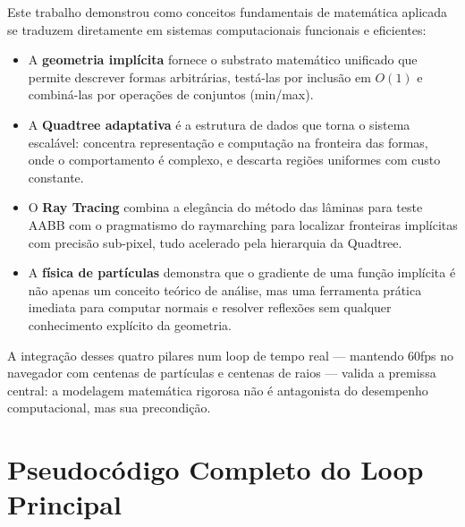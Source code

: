 \documentclass[11pt,a4paper]{article}
\theoremstyle{plain}
\theoremstyle{definition}
\begin{document}
Este trabalho demonstrou como conceitos fundamentais de matemática aplicada se
traduzem diretamente em sistemas computacionais funcionais e eficientes:

\begin{itemize}
    \item A \textbf{geometria implícita} fornece o substrato matemático unificado
    que permite descrever formas arbitrárias, testá-las por inclusão em $O(1)$ e
    combiná-las por operações de conjuntos (min/max).

    \item A \textbf{Quadtree adaptativa} é a estrutura de dados que torna o
    sistema escalável: concentra representação e computação na fronteira das
    formas, onde o comportamento é complexo, e descarta regiões uniformes com
    custo constante.

    \item O \textbf{Ray Tracing} combina a elegância do método das lâminas para
    teste AABB com o pragmatismo do raymarching para localizar fronteiras
    implícitas com precisão sub-pixel, tudo acelerado pela hierarquia da Quadtree.

    \item A \textbf{física de partículas} demonstra que o gradiente de uma função
    implícita é não apenas um conceito teórico de análise, mas uma ferramenta
    prática imediata para computar normais e resolver reflexões sem qualquer
    conhecimento explícito da geometria.
\end{itemize}

A integração desses quatro pilares num loop de tempo real --- mantendo 60fps no
navegador com centenas de partículas e centenas de raios --- valida a premissa
central: a modelagem matemática rigorosa não é antagonista do desempenho
computacional, mas sua precondição.

\appendix
\section{Pseudocódigo Completo do Loop Principal}
\end{document}
